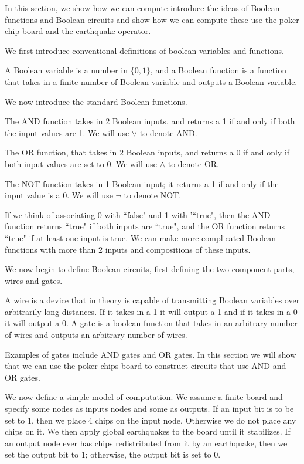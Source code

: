 \documentclass[runningheads,a4paper]{llncs}
\begin{document}
In this section, we show how we can compute introduce the ideas of Boolean functions and Boolean circuits and show how we can compute these use the poker chip board and the earthquake operator.

We first introduce conventional definitions of boolean variables and functions.
\begin{definition} 
A Boolean variable is a number in $\{0,1\}$, and a Boolean function is a function that takes in a finite number of Boolean variable and outputs a Boolean variable.
\end{definition}

We now introduce the standard Boolean functions. 
\begin{definition}
 The AND function takes in 2 Boolean inputs, and returns a 1 if and only if both the input values are 1. We will use $\vee$ to denote AND.
\end{definition}
\begin{definition}
The OR function, that takes in 2 Boolean inputs, and returns a 0 if and only if both input values are set to 0. We will use $\wedge$ to denote OR.
\end{definition}
\begin{definition}
The NOT function takes in 1 Boolean input; it returns a 1 if and only if the input value is a 0. We will use $\neg$ to denote NOT.
 \end{definition}
 If we think of associating 0 with ``false" and 1 with '``true", then the AND function returns ``true" if both inputs are ``true", and the OR function returns ``true" if at least one input is true. We can make more complicated Boolean functions with more than 2 inputs and compositions of these inputs. 
 
 We now begin to define Boolean circuits, first defining the two component parts, wires and gates.
\begin{definition}
 A wire is a device that in theory is capable of transmitting Boolean variables over arbitrarily long distances. If it takes in a 1 it will output a 1 and if it takes in a 0 it will output a 0. A gate is a boolean function that takes in an arbitrary number of wires and outputs an arbitrary number of wires.
\end{definition}
Examples of gates include AND gates and OR gates. In this section we will show that we can use the poker chips board to construct circuits that use AND and OR gates.

We now define a simple model of computation. We assume a finite board and specify some nodes as inputs nodes and some as outputs. If an input bit is to be set to 1, then we place 4 chips on the input node. Otherwise we do not place any chips on it. We then apply global earthquakes to the board until it stabilizes. If an output node ever has chips redistributed from it by an earthquake, then we set the output bit to 1; otherwise, the output bit is set to 0. 
\end{document}

